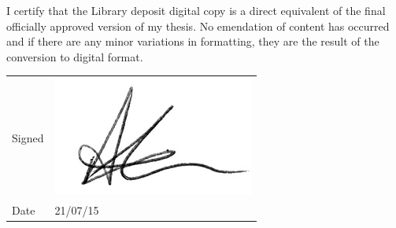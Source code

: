 \begin{copyright-statement}
\begin{center}
\end{center}
\vspace{1cm}
\normalsize

I certify that the Library deposit digital copy is a direct equivalent of the final officially approved version of my thesis. No emendation of content has occurred and if there are any minor variations in formatting, they are the result of the conversion to digital format.

\vspace{1cm}

\begin{tabular}[h!]{lp{6cm}}
  Signed & \includegraphics[height=1.5\baselineskip]{Copyright/sig-crop} \\
  Date & 21/07/15
\end{tabular}

\end{copyright-statement}

